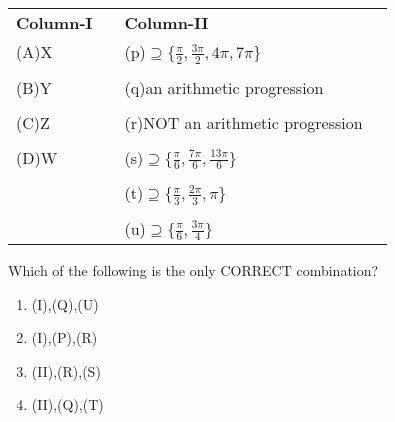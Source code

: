 \begin{enumerate}[label=\arabic*.,ref=\thesubsection.\theenumi]
\begin{enumerate}
\begin{tabular}{llll}
\textbf{Column-I} &   \enspace   &   \textbf{Column-II}\\
(A)X &   \enspace   &   (p)$\supseteq\{{\frac{\pi}{2}},{\frac{3\pi}{2}},4\pi,7\pi\}$\\
&&&\\
(B)Y    &   \enspace   & (q)an arithmetic progression\\
&&&\\
(C)Z    &\enspace   &   (r)NOT an arithmetic progression\\
&&&\\
(D)W &\enspace   &   (s)$\supseteq\{{\frac{\pi}{6}},{\frac{7\pi}{6}},{\frac{13\pi}{6}}\}$\\
&&&\\
    &\enspace   &   (t)$\supseteq\{{\frac{\pi}{3}},{\frac{2\pi}{3}},\pi\}$\\&&&\\
    &\enspace  &   (u)$\supseteq\{{\frac{\pi}{6}},{\frac{3\pi}{4}}\}$\\
\end{tabular}
Which of the following is the only CORRECT combination?\\
\begin{enumerate}
    \item (I),(Q),(U)
    \item (I),(P),(R)
    \item (II),(R),(S)
    \item (II),(Q),(T)
\end{enumerate}
\end{enumerate}
    \end{enumerate}
%
    
